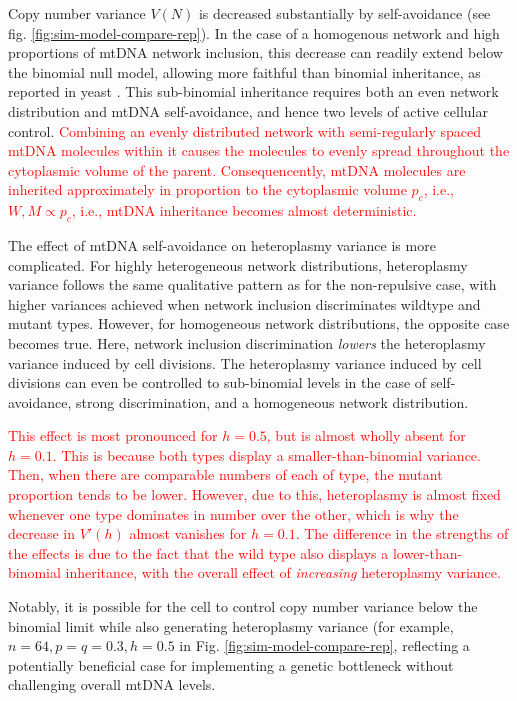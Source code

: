 \documentclass{article}
\begin{document}
Copy number variance $V(N)$ is decreased substantially by self-avoidance (see fig. \ref{fig:sim-model-compare-rep}). In the case of a homogenous network and high proportions of mtDNA network inclusion, this decrease can readily extend below the binomial null model, allowing more faithful than binomial inheritance, as reported in yeast \cite{jajoo2016accurate}. This sub-binomial inheritance requires both an even network distribution and mtDNA self-avoidance, and hence two levels of active cellular control. \textcolor{red}{Combining an evenly distributed network with semi-regularly spaced mtDNA molecules within it causes the molecules to evenly spread throughout the cytoplasmic volume of the parent. Consequencently, mtDNA molecules are inherited approximately in proportion to the cytoplasmic volume $p_c$, i.e., $W,M\propto p_c$, i.e., mtDNA inheritance becomes almost deterministic.}%

The effect of mtDNA self-avoidance on heteroplasmy variance is more complicated. For highly heterogeneous network distributions, heteroplasmy variance follows the same qualitative pattern as for the non-repulsive case, with higher variances achieved when network inclusion discriminates wildtype and mutant types. However, for homogeneous network distributions, the opposite case becomes true. Here, network inclusion discrimination \emph{lowers} the heteroplasmy variance induced by cell divisions. The heteroplasmy variance induced by cell divisions can even be controlled to sub-binomial levels in the case of self-avoidance, strong discrimination, and a homogeneous network distribution.

\textcolor{red}{This effect is most pronounced for $h=0.5$, but is almost wholly absent for $h=0.1$. This is because both types display a smaller-than-binomial variance. Then, when there are comparable numbers of each of type, the mutant proportion tends to be lower. However, due to this, heteroplasmy is almost fixed whenever one type dominates in number over the other, which is why the decrease in $V'(h)$ almost vanishes for $h=0.1$. The difference in the strengths of the effects is due to the fact that the wild type also displays a lower-than-binomial inheritance, with the overall effect of \textit{increasing} heteroplasmy variance.}

Notably, it is possible for the cell to control copy number variance below the binomial limit while also generating heteroplasmy variance (for example, $n = 64, p = q = 0.3, h = 0.5$ in Fig. \ref{fig:sim-model-compare-rep}, reflecting a potentially beneficial case for implementing a genetic bottleneck without challenging overall mtDNA levels.
\end{document}
